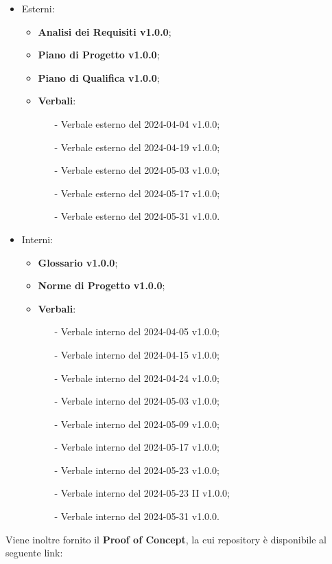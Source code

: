 \documentclass[8pt]{article}
\begin{document}
\begin{itemize}
    \item Esterni:
\begin{itemize}
    \item \textbf{Analisi dei Requisiti v1.0.0};
    \item \textbf{Piano di Progetto v1.0.0};
    \item \textbf{Piano di Qualifica v1.0.0};
    \item \textbf{Verbali}:
    \begin{itemize}
			\item[-] Verbale esterno del 2024-04-04 v1.0.0;
			\item[-] Verbale esterno del 2024-04-19 v1.0.0;
			\item[-] Verbale esterno del 2024-05-03 v1.0.0;
			\item[-] Verbale esterno del 2024-05-17 v1.0.0;
			\item[-] Verbale esterno del 2024-05-31 v1.0.0.
    \end{itemize}
\end{itemize}
    \item Interni:
\begin{itemize}
    \item \textbf{Glossario v1.0.0};
    \item \textbf{Norme di Progetto v1.0.0};
    \item \textbf{Verbali}:
    \begin{itemize}
			\item[-] Verbale interno del 2024-04-05 v1.0.0;
			\item[-] Verbale interno del 2024-04-15 v1.0.0;
			\item[-] Verbale interno del 2024-04-24 v1.0.0;	
			\item[-] Verbale interno del 2024-05-03 v1.0.0;
			\item[-] Verbale interno del 2024-05-09 v1.0.0;
			\item[-] Verbale interno del 2024-05-17 v1.0.0;
			\item[-] Verbale interno del 2024-05-23 v1.0.0;
      \item[-] Verbale interno del 2024-05-23 II v1.0.0; 
			\item[-] Verbale interno del 2024-05-31 v1.0.0.
    \end{itemize}
\end{itemize}
\end{itemize}
\vspace{1em}
Viene inoltre fornito il \textbf{Proof of Concept}, la cui repository è disponibile al seguente link:
\end{document}
